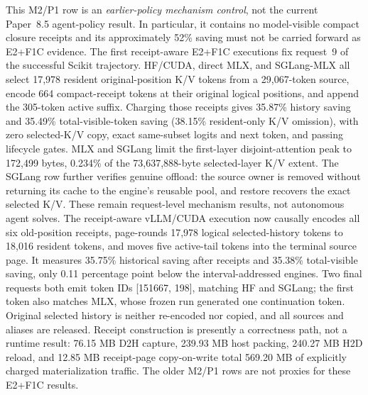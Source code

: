 \documentclass[11pt]{article}
\begin{document}
This M2/P1 row is an \emph{earlier-policy mechanism control}, not the current
Paper~8.5 agent-policy result.  In particular, it contains no model-visible
compact closure receipts and its approximately 52\% saving must not be carried
forward as E2+F1C evidence.  The first receipt-aware E2+F1C executions fix
request~9 of the successful Scikit trajectory.  HF/CUDA, direct MLX, and
SGLang-MLX all
select 17,978 resident original-position K/V tokens from a 29,067-token source,
encode 664 compact-receipt tokens at their original logical positions, and
append the 305-token active suffix.  Charging those receipts gives 35.87\%
history saving and 35.49\% total-visible-token saving (38.15\% resident-only
K/V omission), with zero selected-K/V copy, exact same-subset logits and next
token, and passing lifecycle gates.  MLX and SGLang limit the first-layer
disjoint-attention peak to 172,499 bytes, 0.234\% of the 73,637,888-byte
selected-layer K/V extent.  The SGLang row further verifies genuine
offload: the source owner is removed without returning its cache to the
engine's reusable pool, and restore recovers the exact selected K/V.  These
remain request-level mechanism results, not autonomous agent solves.  The
receipt-aware vLLM/CUDA execution now causally encodes all six old-position
receipts, page-rounds 17,978 logical selected-history tokens to 18,016 resident
tokens, and moves five active-tail tokens into the terminal source page.  It
measures 35.75\% historical saving after receipts and 35.38\% total-visible
saving, only 0.11 percentage point below the interval-addressed engines.  Two
final requests both emit token IDs [151667, 198], matching HF and SGLang; the
first token also matches MLX, whose frozen run generated one continuation token.
Original selected history is neither re-encoded nor copied, and all sources
and aliases are released.  Receipt construction is presently a correctness
path, not a runtime result: 76.15 MB D2H capture, 239.93 MB host packing,
240.27 MB H2D reload, and 12.85 MB receipt-page copy-on-write total 569.20 MB
of explicitly charged materialization traffic.  The older M2/P1 rows are not
proxies for these E2+F1C results.
\end{document}
